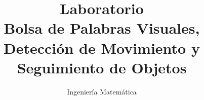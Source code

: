 \documentclass{tudelft-report}
\begin{document}
\frontmatter

\title{\textbf{Laboratorio} \\ Bolsa de Palabras Visuales, Detección de Movimiento y Seguimiento de Objetos}
\author{Ingeniería Matemática}

\subject{Visión por Ordenador I} %

\makecover


%
%

\tableofcontents

%


\mainmatter








\setcounter{biburlnumpenalty}{7000}
\setcounter{biburllcpenalty}{7000}
\setcounter{biburlucpenalty}{7000}




%
%
\end{document}
